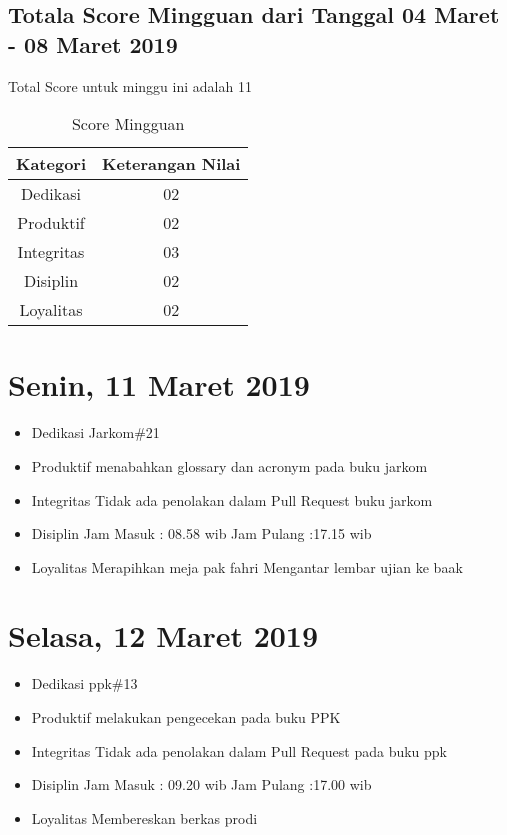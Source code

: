 \subsection{Totala Score Mingguan dari Tanggal 04 Maret - 08 Maret 2019}
Total Score untuk minggu ini adalah 11

\begin{table}[h]
\caption{Score Mingguan}
\centering
\begin{tabular}{|c|c|}
\hline
\textbf{Kategori}&\textbf{Keterangan Nilai}\\
\hline
Dedikasi&02\\
\hline
Produktif&02\\
\hline
Integritas&03\\
\hline
Disiplin&02\\
\hline
Loyalitas&02\\
\hline
\end{tabular}
\label{table:score mingguan}
\end{table}


\section{Senin, 11 Maret 2019}
\begin{itemize}
\item Dedikasi
\subitem Jarkom\#21
\item Produktif
  \subitem menabahkan glossary dan acronym pada buku jarkom
\item Integritas
  \subitem Tidak ada penolakan dalam Pull Request buku jarkom
\item Disiplin
  \subitem Jam Masuk : 08.58 wib
  \subitem Jam Pulang :17.15 wib
\item Loyalitas
  \subitem Merapihkan meja pak fahri
  \subitem Mengantar lembar ujian ke baak
\end{itemize}

\section{Selasa, 12 Maret 2019}
\begin{itemize}
\item Dedikasi
\subitem ppk\#13
\item Produktif
  \subitem melakukan pengecekan pada buku PPK
\item Integritas
  \subitem Tidak ada penolakan dalam Pull Request pada buku ppk
\item Disiplin
  \subitem Jam Masuk : 09.20 wib
  \subitem Jam Pulang :17.00 wib
\item Loyalitas
  \subitem Membereskan berkas prodi
\end{itemize} 

